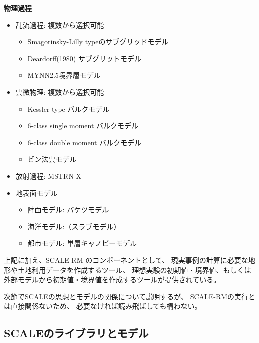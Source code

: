 {\bf 物理過程}
\begin{itemize}
 \item 乱流過程: 複数から選択可能
   \begin{itemize}
    \item Smagorinsky-Lilly typeのサブグリッドモデル \citep{smagorinsky_1963,lilly_1962}
    \item Deardorff(1980) サブグリットモデル \citep{Deardorff_1980}
    \item MYNN2.5境界層モデル \citep{my_1982,nakanishi_2004}
   \end{itemize}
 \item 雲微物理: 複数から選択可能
   \begin{itemize}
    \item Kessler type バルクモデル \citep{kessler_1969}
    \item 6-class single moment バルクモデル \citep{tomita_2008}
    \item 6-class double moment バルクモデル \citep{sn_2014}
    \item ビン法雲モデル \citep{suzuki_etal_2010}
   \end{itemize}
 \item 放射過程: MSTRN-X \citep{sekiguchi_2008}
 \item 地表面モデル
  \begin{itemize}
   \item 陸面モデル: バケツモデル \citep[バルク交換係数は][]{beljaars_1991,wilson_2001}
   \item 海洋モデル:（スラブモデル）
   \item 都市モデル: 単層キャノピーモデル \citep{kusaka_2001}
  \end{itemize}
\end{itemize}

上記に加え、SCALE-RM のコンポーネントとして、
現実事例の計算に必要な地形や土地利用データを作成するツール、
理想実験の初期値・境界値、もしくは外部モデルから初期値・境界値を作成するツールが提供されている。

次節でSCALEの思想とモデルの関係について説明するが、
SCALE-RMの実行とは直接関係ないため、
必要なければ読み飛ばしても構わない。


\subsection{SCALEのライブラリとモデル}


